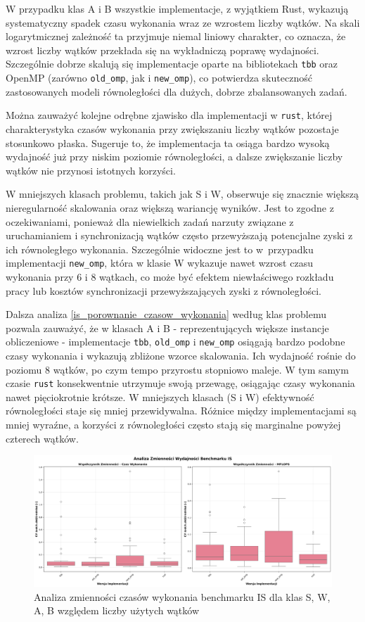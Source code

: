 W przypadku klas A i B wszystkie implementacje, z wyjątkiem Rust, wykazują systematyczny spadek czasu wykonania wraz ze wzrostem liczby wątków. Na skali logarytmicznej zależność ta przyjmuje niemal liniowy charakter, co oznacza, że wzrost liczby wątków przekłada się na wykładniczą poprawę wydajności. Szczególnie dobrze skalują się implementacje oparte na bibliotekach \texttt{tbb} oraz OpenMP (zarówno \texttt{old\_omp}, jak i \texttt{new\_omp}), co potwierdza skuteczność zastosowanych modeli równoległości dla dużych, dobrze zbalansowanych zadań.

Można zauważyć kolejne odrębne zjawisko dla implementacji w \texttt{rust}, której charakterystyka czasów wykonania przy zwiększaniu liczby wątków pozostaje stosunkowo płaska. Sugeruje to, że implementacja ta osiąga bardzo wysoką wydajność już przy niskim poziomie równoległości, a dalsze zwiększanie liczby wątków nie przynosi istotnych korzyści.

W mniejszych klasach problemu, takich jak S i W, obserwuje się znacznie większą nieregularność skalowania oraz większą wariancję wyników. Jest to zgodne z oczekiwaniami, ponieważ dla niewielkich zadań narzuty związane z uruchamianiem i synchronizacją wątków często przewyższają potencjalne zyski z ich równoległego wykonania. Szczególnie widoczne jest to w~przypadku implementacji \texttt{new\_omp}, która w klasie W wykazuje nawet wzrost czasu wykonania przy 6 i 8 wątkach, co może być efektem niewłaściwego rozkładu pracy lub kosztów synchronizacji przewyższających zyski z równoległości.

Dalsza analiza \ref{is_porownanie_czasow_wykonania} według klas problemu pozwala zauważyć, że w klasach A i B - reprezentujących większe instancje obliczeniowe - implementacje \texttt{\texttt{tbb}}, \texttt{old\_omp} i \texttt{new\_omp} osiągają bardzo podobne czasy wykonania i wykazują zbliżone wzorce skalowania. Ich wydajność rośnie do poziomu 8 wątków, po czym tempo przyrostu stopniowo maleje. W tym samym czasie \texttt{rust} konsekwentnie utrzymuje swoją przewagę, osiągając czasy wykonania nawet pięciokrotnie krótsze. W mniejszych klasach (S i W) efektywność równoległości staje się mniej przewidywalna. Różnice między implementacjami są mniej wyraźne, a korzyści z równoległości często stają się marginalne powyżej czterech wątków.

\begin{figure}[H]
    \centering
    \includegraphics[width=\textwidth]{analiza/images/parallel/is/arm/is_analiza_zmiennosci.png}
    \caption{Analiza zmienności czasów wykonania benchmarku IS dla klas S, W, A, B względem liczby użytych wątków}
    \label{is_analiza_zmiennosci}
\end{figure}

